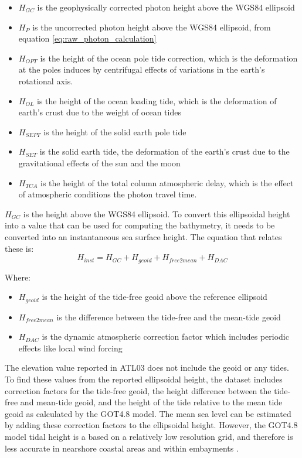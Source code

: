 \begin{itemize}
      \item \(H_{GC}\) is the geophysically corrected photon height above the WGS84 ellipsoid
      \item \(H_{P}\) is the uncorrected photon height above the WGS84 ellipsoid, from equation \ref{eq:raw_photon_calculation}
      \item \(H_{OPT}\) is the height of the ocean pole tide correction, which is the deformation at the poles induces by centrifugal effects of variations in the earth's rotational axis.
      \item \(H_{OL}\) is the height of the ocean loading tide, which is the deformation of earth's crust due to the weight of ocean tides
      \item \(H_{SEPT}\) is the height of the solid earth pole tide
      \item \(H_{SET}\) is the solid earth tide, the deformation of the earth's crust due to the gravitational effects of the sun and the moon
      \item \(H_{TCA}\) is the height of the total column atmospheric delay, which is the effect of atmospheric conditions the photon travel time.
\end{itemize}

$H_{GC}$ is the height above the WGS84 ellipsoid. To convert this ellipsoidal height into a value that can be used for computing the bathymetry, it needs to be converted into an instantaneous sea surface height. The equation that relates these is:
\begin{equation}
      H_{inst} = H_{GC} + H_{geoid} + H_{free2mean} + H_{DAC}
\end{equation}

Where:
\begin{itemize}
      \item $H_{geoid}$ is the height of the tide-free geoid above the reference ellipsoid
      \item $H_{free2mean}$ is the difference between the tide-free and the mean-tide geoid
      \item $H_{DAC}$ is the dynamic atmospheric correction factor which includes periodic effects like local wind forcing
\end{itemize}

The elevation value reported in ATL03 does not include the geoid or any tides. To find these values from the reported ellipsoidal height, the dataset includes correction factors for the tide-free geoid, the height difference between the tide-free and mean-tide geoid, and the height of the tide relative to the mean tide geoid as calculated by the GOT4.8 model. The mean sea level can be estimated by adding these correction factors to the ellipsoidal height. However, the GOT4.8 model tidal height is a based on a relatively low resolution grid, and therefore is less accurate in nearshore coastal areas and within embayments \parencite{Neumann2019e}.

